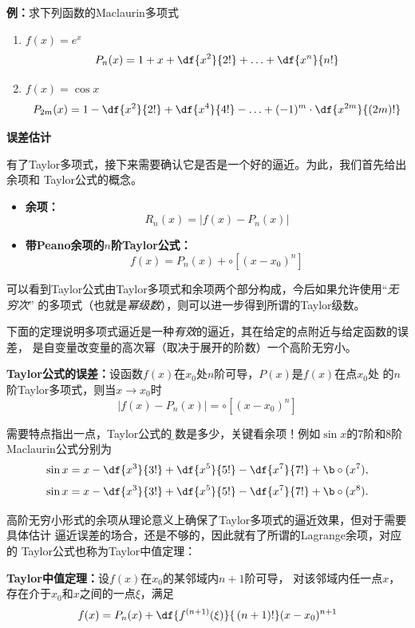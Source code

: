 {\bf 例：}求下列函数的Maclaurin多项式
\begin{enumerate}[(1)]
  \setlength{\itemindent}{1cm}
  \item $f(x)=e^x$ 
  $${P_n(x)=1+x+\df{x^2}{2!}+\ldots+\df{x^n}{n!}}$$ 
  \item $f(x)=\cos x$ 
  $${P_{2m}(x)=1-\df{x^2}{2!}+\df{x^4}{4!}-\ldots+(-1)^m\cdot\df{x^{2m}}{(2m)!}}$$
\end{enumerate}

{\bf 误差估计}

有了Taylor多项式，接下来需要确认它是否是一个好的逼近。为此，我们首先给出余项和
Taylor公式的概念。

\begin{thx}
	\begin{itemize}
	  \item {\bf 余项：}
	  $$R_n(x)=|f(x)-P_n(x)|$$ 
	  \item {\bf 带Peano余项的$n$阶Taylor公式：}
	  $$f(x)=P_n(x)+\circ[(x-x_0)^n]$$
	\end{itemize}
\end{thx}

可以看到Taylor公式由Taylor多项式和余项两个部分构成，今后如果允许使用“{\it 无穷次}”
的多项式（也就是{\it 幂级数}），则可以进一步得到所谓的{\kaishu Taylor级数}。

下面的定理说明多项式逼近是一种{\it 有效}的逼近，其在给定的点附近与给定函数的误差，
是自变量改变量的高次幂（取决于展开的阶数）一个高阶无穷小。

\begin{thx}
	{\bf Taylor公式的误差：}设函数$f(x)$在$x_0$处$n$阶可导，$P(x)$是$f(x)$在点$x_0$处
	的$n$阶Taylor多项式，则当$x\to x_0$时
	$${|f(x)-P_n(x)|=\circ[(x-x_0)^n]}$$
\end{thx}

需要特点指出一点，Taylor公式的{\b 阶数是多少，关键看余项！}例如$\sin x$的7阶和8阶Maclaurin公式分别为
$$\sin x=x-\df{x^3}{3!}+\df{x^5}{5!}-\df{x^7}{7!}+{\b\circ(x^7)},$$
$$\sin x=x-\df{x^3}{3!}+\df{x^5}{5!}-\df{x^7}{7!}+{\b\circ(x^8)}.$$

高阶无穷小形式的余项从理论意义上确保了Taylor多项式的逼近效果，但对于需要具体估计
逼近误差的场合，还是不够的，因此就有了所谓的{\kaishu Lagrange余项}，对应的
Taylor公式也称为Taylor中值定理：

\begin{thx}
	{\bf Taylor中值定理：}设$f(x)$在$x_0$的某邻域内$n+1$阶可导，
	对该邻域内任一点$x$，存在介于$x_0$和$x$之间的一点$\xi$，满足
	$$f(x)=P_n(x)+\df{f^{(n+1)}(\xi)}{\,(n+1)!}(x-x_0)^{n+1}$$
\end{thx}

